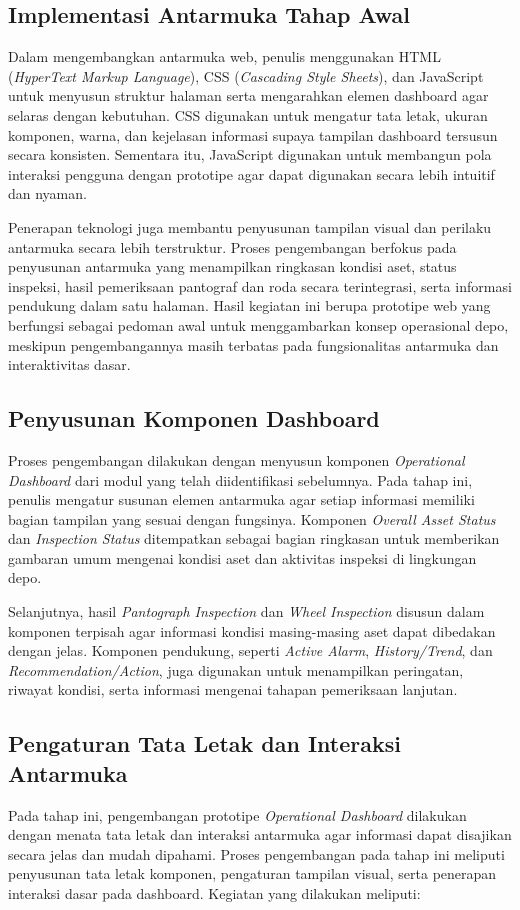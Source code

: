 \subsection{Implementasi Antarmuka Tahap Awal}
Dalam mengembangkan antarmuka web, penulis menggunakan HTML (\textit{HyperText Markup Language}), CSS (\textit{Cascading Style Sheets}), dan JavaScript untuk menyusun struktur halaman serta mengarahkan elemen dashboard agar selaras dengan kebutuhan. CSS digunakan untuk mengatur tata letak, ukuran komponen, warna, dan kejelasan informasi supaya tampilan dashboard tersusun secara konsisten. Sementara itu, JavaScript digunakan untuk membangun pola interaksi pengguna dengan prototipe agar dapat digunakan secara lebih intuitif dan nyaman.

Penerapan teknologi juga membantu penyusunan tampilan visual dan perilaku antarmuka secara lebih terstruktur. Proses pengembangan berfokus pada penyusunan antarmuka yang menampilkan ringkasan kondisi aset, status inspeksi, hasil pemeriksaan pantograf dan roda secara terintegrasi, serta informasi pendukung dalam satu halaman. Hasil kegiatan ini berupa prototipe web yang berfungsi sebagai pedoman awal untuk menggambarkan konsep operasional depo, meskipun pengembangannya masih terbatas pada fungsionalitas antarmuka dan interaktivitas dasar.

\subsection{Penyusunan Komponen Dashboard}
Proses pengembangan dilakukan dengan menyusun komponen \textit{Operational Dashboard} dari modul yang telah diidentifikasi sebelumnya. Pada tahap ini, penulis mengatur susunan elemen antarmuka agar setiap informasi memiliki bagian tampilan yang sesuai dengan fungsinya. Komponen \textit{Overall Asset Status} dan \textit{Inspection Status} ditempatkan sebagai bagian ringkasan untuk memberikan gambaran umum mengenai kondisi aset dan aktivitas inspeksi di lingkungan depo.

Selanjutnya, hasil \textit{Pantograph Inspection} dan \textit{Wheel Inspection} disusun dalam komponen terpisah agar informasi kondisi masing-masing aset dapat dibedakan dengan jelas. Komponen pendukung, seperti \textit{Active Alarm}, \textit{History/Trend}, dan \textit{Recommendation/Action}, juga digunakan untuk menampilkan peringatan, riwayat kondisi, serta informasi mengenai tahapan pemeriksaan lanjutan.

\subsection{Pengaturan Tata Letak dan Interaksi Antarmuka}
Pada tahap ini, pengembangan prototipe \textit{Operational Dashboard} dilakukan dengan menata tata letak dan interaksi antarmuka agar informasi dapat disajikan secara jelas dan mudah dipahami. Proses pengembangan pada tahap ini meliputi penyusunan tata letak komponen, pengaturan tampilan visual, serta penerapan interaksi dasar pada dashboard. Kegiatan yang dilakukan meliputi:

